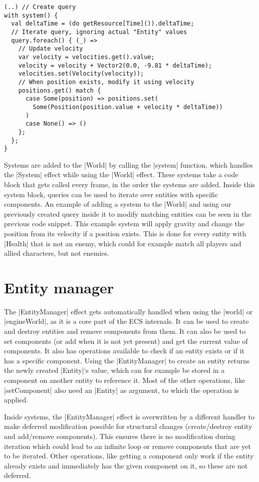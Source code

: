 \begin{lstlisting}[caption=System example for gravity]
(..) // Create query
with system() {
  val deltaTime = (do getResource[Time]()).deltaTime;
  // Iterate query, ignoring actual "Entity" values
  query.foreach() { (_) =>
    // Update velocity
    var velocity = velocities.get().value;
    velocity = velocity + Vector2(0.0, -9.81 * deltaTime);
    velocities.set(Velocity(velocity));
    // When position exists, modify it using velocity
    positions.get() match {
      case Some(position) => positions.set(
        Some(Position(position.value + velocity * deltaTime))
      )
      case None() => ()
    };
  };
}
\end{lstlisting}

Systems are added to the |World| by calling the |system| function, which handles the |System| effect while using the |World| effect. These systems take a code block that gets called every frame, in the order the systems are added. Inside this system block, queries can be used to iterate over entities with specific components. An example of adding a system to the |World| and using our previously created query inside it to modify matching entities can be seen in the previous code snippet. This example system will apply gravity and change the position from its velocity if a position exists. This is done for every entity with |Health| that is not an enemy, which could for example match all players and allied characters, but not enemies.

\section{Entity manager}

The |EntityManager| effect gets automatically handled when using the |world| or |engineWorld|, as it is a core part of the ECS internals. It can be used to create and destroy entities and remove components from them. It can also be used to set components (or add when it is not yet present) and get the current value of components. It also has operations available to check if an entity exists or if it has a specific component. Using the |EntityManager| to create an entity returns the newly created |Entity|`s value, which can for example be stored in a component on another entity to reference it. Most of the other operations, like |setComponent| also need an |Entity| as argument, to which the operation is applied.

Inside systems, the |EntityManager| effect is overwritten by a different handler to make deferred modification possible for structural changes (create/destroy entity and add/remove components). This ensures there is no modification during iteration which could lead to an infinite loop or remove components that are yet to be iterated. Other operations, like getting a component only work if the entity already exists and immediately has the given component on it, so these are not deferred.
